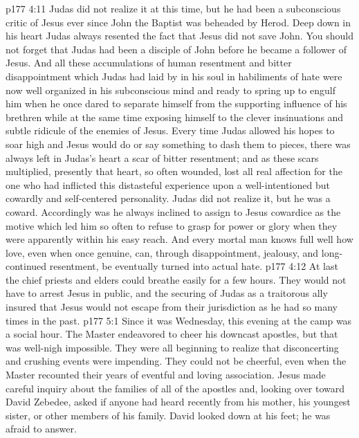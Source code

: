 \vs p177 4:11 Judas did not realize it at this time, but he had been a subconscious critic of Jesus ever since John the Baptist was beheaded by Herod. Deep down in his heart Judas always resented the fact that Jesus did not save John. You should not forget that Judas had been a disciple of John before he became a follower of Jesus. And all these accumulations of human resentment and bitter disappointment which Judas had laid by in his soul in habiliments of hate were now well organized in his subconscious mind and ready to spring up to engulf him when he once dared to separate himself from the supporting influence of his brethren while at the same time exposing himself to the clever insinuations and subtle ridicule of the enemies of Jesus. Every time Judas allowed his hopes to soar high and Jesus would do or say something to dash them to pieces, there was always left in Judas’s heart a scar of bitter resentment; and as these scars multiplied, presently that heart, so often wounded, lost all real affection for the one who had inflicted this distasteful experience upon a well\hyp{}intentioned but cowardly and self\hyp{}centered personality. Judas did not realize it, but he was a coward. Accordingly was he always inclined to assign to Jesus cowardice as the motive which led him so often to refuse to grasp for power or glory when they were apparently within his easy reach. And every mortal man knows full well how love, even when once genuine, can, through disappointment, jealousy, and long\hyp{}continued resentment, be eventually turned into actual hate.
\vs p177 4:12 At last the chief priests and elders could breathe easily for a few hours. They would not have to arrest Jesus in public, and the securing of Judas as a traitorous ally insured that Jesus would not escape from their jurisdiction as he had so many times in the past.
\vs p177 5:1 Since it was Wednesday, this evening at the camp was a social hour. The Master endeavored to cheer his downcast apostles, but that was well\hyp{}nigh impossible. They were all beginning to realize that disconcerting and crushing events were impending. They could not be cheerful, even when the Master recounted their years of eventful and loving association. Jesus made careful inquiry about the families of all of the apostles and, looking over toward David Zebedee, asked if anyone had heard recently from his mother, his youngest sister, or other members of his family. David looked down at his feet; he was afraid to answer.
